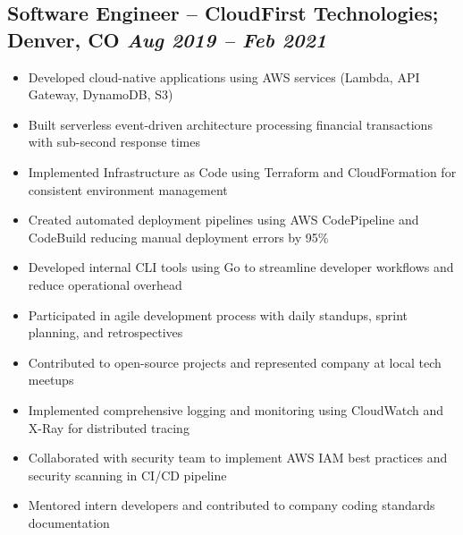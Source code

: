 \documentclass[a4paper,10pt]{article}           %
\begin{document}
    \subsection*{Software Engineer – CloudFirst Technologies; Denver, CO \hfill \textit{Aug 2019 – Feb 2021}}
    \vspace{-0.5em}
    \begin{itemize}[leftmargin=0.2cm, itemsep=0pt, label=--]
        \item Developed cloud-native applications using AWS services (Lambda, API Gateway, DynamoDB, S3)
        \item Built serverless event-driven architecture processing financial transactions with sub-second response times
        \item Implemented Infrastructure as Code using Terraform and CloudFormation for consistent environment management
        \item Created automated deployment pipelines using AWS CodePipeline and CodeBuild reducing manual deployment errors by 95\%
        \item Developed internal CLI tools using Go to streamline developer workflows and reduce operational overhead
        \item Participated in agile development process with daily standups, sprint planning, and retrospectives
        \item Contributed to open-source projects and represented company at local tech meetups
        \item Implemented comprehensive logging and monitoring using CloudWatch and X-Ray for distributed tracing
        \item Collaborated with security team to implement AWS IAM best practices and security scanning in CI/CD pipeline
        \item Mentored intern developers and contributed to company coding standards documentation
    \end{itemize}
\end{document}
